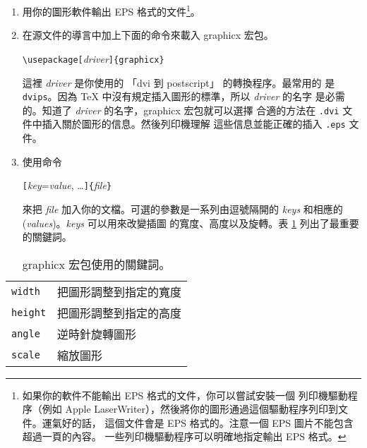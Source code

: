 \begin{enumerate}
\item 用你的圖形軟件輸出 EPS 格式的文件\footnote{如果你的軟件不能輸出 EPS 
      格式的文件，你可以嘗試安裝一個 \PSi{} 列印機驅動程序（例如 Apple
      LaserWriter），然後將你的圖形通過這個驅動程序列印到文件。運氣好的話，
      這個文件會是 EPS 格式的。注意一個 EPS 圖片不能包含超過一頁的內容。
      一些列印機驅動程序可以明確地指定輸出 EPS 格式。}。
\item 在源文件的導言中加上下面的命令來載入 \textsf{graphicx} 宏包。
      \begin{lscommand}
         \verb|\usepackage[|\emph{driver}\verb|]{graphicx}|
      \end{lscommand}
      這裡 \emph{driver} 是你使用的 「dvi 到 postscript」 的轉換程序。最常用的
      是 \texttt{dvips}。因為 \TeX{} 中沒有規定插入圖形的標準，所以 \emph{driver} 的名字
      是必需的。知道了 \emph{driver} 的名字，\textsf{graphicx} 宏包就可以選擇
      合適的方法在 \texttt{.dvi} 文件中插入關於圖形的信息。然後列印機理解
      這些信息並能正確的插入 \texttt{.eps} 文件。
\item 使用命令
      \begin{lscommand}
         \verb|[|\emph{key}=\emph{value}, \ldots\verb|]{|\emph{file}\verb|}|
      \end{lscommand}
      來把 \emph{file} 加入你的文檔。可選的參數是一系列由逗號隔開的
       \emph{keys} 和相應的 (\emph{values})。\emph{keys} 可以用來改變插圖
      的寬度、高度以及旋轉。表 \ref{keyvals} 列出了最重要的關鍵詞。
\end{enumerate}



\begin{table}[!htb]
\caption{\textsf{graphicx} 宏包使用的關鍵詞。} \label{keyvals}
\begin{lined}{9cm}
\begin{tabular}{@{}ll}
\texttt{width}& 把圖形調整到指定的寬度\\
\texttt{height}& 把圖形調整到指定的高度\\
\texttt{angle}& 逆時針旋轉圖形\\
\texttt{scale}& 縮放圖形\\
\end{tabular}

\bigskip
\end{lined}
\end{table}

